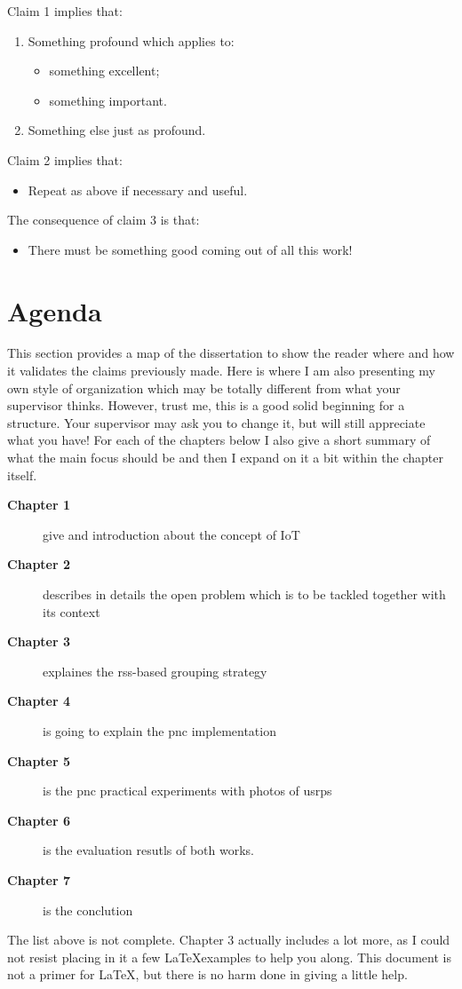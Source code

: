 \noindent Claim 1 implies that:
\begin{enumerate}
\item{Something profound which applies to:
	\begin{itemize}
	\item {something excellent;}
	\item {something important.}
	\end{itemize}}
\item{Something else just as profound.}
\end{enumerate}

\noindent Claim 2 implies that:
\begin{itemize}
\item{Repeat as above if necessary and useful.}
\end{itemize}

\noindent The consequence of claim 3 is that:
\begin{itemize}
\item{There must be something good coming out of all this work!}
\end{itemize}

\section{Agenda}

This section provides a map of the dissertation
to show the reader where and how it validates
the claims previously made. Here is where I am also presenting my own style of organization which may be totally different from what your supervisor thinks. However, trust me, this is a good solid beginning for a structure. Your supervisor may ask you to change it, but will still appreciate what you have! For each of the chapters below I also give a short summary of what the main focus should be and then I expand on it  a bit within the chapter itself.

\begin{description}
\item[\textbf{Chapter 1}] give and introduction about the concept of IoT
\item[\textbf{Chapter 2}] describes in details the open problem which is to be tackled together with its context
\item[\textbf{Chapter 3}] explaines the rss-based grouping strategy
\item[\textbf{Chapter 4}] is going to explain the pnc implementation
\item[\textbf{Chapter 5}] is the pnc practical experiments with photos of usrps
\item[\textbf{Chapter 6}] is the evaluation resutls of both works.
\item[\textbf{Chapter 7}] is the conclution
\end{description}

The list above is not complete. Chapter 3 actually includes a lot more, as I could not resist placing in it a few \LaTeX examples to help you along. This document is not a primer for \LaTeX, but there is no harm done in giving a little help.
